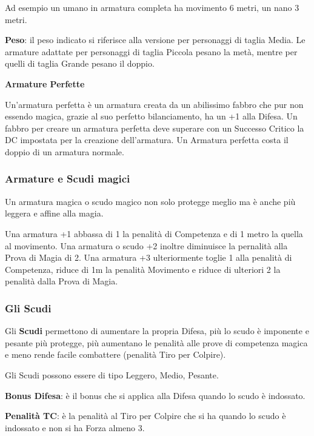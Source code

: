 \begin{multicols}{2}
Ad esempio un umano in armatura completa ha movimento 6 metri, un nano 3 metri.

\textbf{Peso}: il peso indicato si riferisce alla versione per personaggi di taglia Media. Le armature adattate per personaggi di taglia Piccola pesano la metà, mentre per quelli di taglia Grande pesano il doppio.

\textbf{Armature Perfette}

Un'armatura perfetta è un armatura creata da un abilissimo fabbro che pur non essendo magica, grazie al suo perfetto bilanciamento, ha un +1 alla Difesa. Un fabbro per creare un armatura perfetta deve superare con un Successo Critico la DC impostata per la creazione dell'armatura. Un Armatura perfetta costa il doppio di un armatura normale.

\subsubsection{Armature e Scudi magici}\label{armaturaescudimagici}\hypertarget{armaturaescudimagici}{}

Un armatura magica o scudo magico non solo protegge meglio ma è anche più leggera e affine alla magia.

Una armatura +1 abbassa di 1 la penalità di Competenza e di 1 metro la quella al movimento.
Una armatura o scudo +2 inoltre diminuisce la pernalità alla Prova di Magia di 2. Una armatura +3 ulteriormente toglie 1 alla penalità di Competenza, riduce di 1m la penalità Movimento e riduce di ulteriori 2 la penalità dalla Prova di Magia.

\subsubsection{Gli Scudi}

Gli \textbf{Scudi} permettono di aumentare la propria Difesa, più lo scudo è imponente e pesante più protegge, più aumentano le penalità alle prove di competenza magica e meno rende facile combattere (penalità Tiro per Colpire).

Gli Scudi possono essere di tipo Leggero, Medio, Pesante.

\textbf{Bonus Difesa}: è il bonus che si applica alla Difesa quando lo scudo è indossato.

\textbf{Penalità TC}: è la penalità al Tiro per Colpire che si ha quando lo scudo è indossato e non si ha Forza almeno 3.


\end{multicols}
